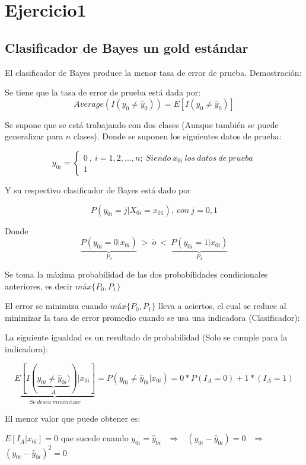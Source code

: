 \documentclass[
  12pt,
  letterpaper,
]{article}
\author{}
\date{\vspace{-2.5em}}
\begin{document}

\thispagestyle{empty}
\tableofcontents
\newpage
\thispagestyle{empty}
\listoffigures
\newpage

\pagestyle{myheadings}
\setcounter{page}{4}

\section{Ejercicio1}
\subsection{Clasificador de Bayes un gold estándar}

El clasificador de Bayes produce la menor tasa de error de prueba.
Demostración:

Se tiene que la tasa de error de prueba está dada por:
\[Average(I(y_0 \neq \hat{y}_0))=E[I(y_0 \neq \hat{y}_0)]\]

Se supone que se está trabajando con dos clases (Aunque también se puede
generalizar para \(n\) clases). Donde se suponen los siguientes datos de
prueba:

\[ y_{0i} = \left\lbrace \begin{array}{ll}
0 ~, ~ i=1,2,...,n;~Siendo~x_{0i}~los~datos~de~prueba \\
1
\end{array}
\right.\]

Y su respectivo clasificador de Bayes está dado por

\[P(y_{0i} = j |X_{0i}= x_{01}),~ con ~ j = 0,1\]

Donde
\[\underbrace{P(y_{0i} = 0 | x_{0i})}_{P_0} ~ > ~ \acute{o} ~ < ~ \underbrace{P(y_{0i} = 1 |x_{0i})}_{P_1}\]

Se toma la máxima probabilidad de las dos probabilidades condicionales
anteriores, es decir \(máx\{P_0, P_1\}\)

El error se minimiza cuando \(máx\{P_0, P_1\}\) lleva a aciertos, el
cual se reduce al minimizar la tasa de error promedio cuando se usa una
indicadora (Clasificador):

La siguiente igualdad es un resultado de probabilidad (Solo se cumple
para la indicadora):

\[\underbrace{E[I(\underbrace{y_{0i}\neq \widehat{y}_{0i}) }_{A})|x_{0i}]}_{Se~ desea~ minimizar}=P(y_{0i}\neq \widehat{y}_{0i}|x_{0i})=0*P(I_A=0)+1*(I_A=1)\]

El menor valor que puede obtener es:

\(E[I_{A}|x_{0i}] = 0\) que sucede cuando \(y_{0i}=\hat{y}_{0i}~~\)
\(\Longrightarrow~~\) \((y_{0i} - \hat{y}_{0i}) = 0\)
\(~~\Longrightarrow~~\) \((y_{0i} - \hat{y}_{0i})^2=0\)
\end{document}
